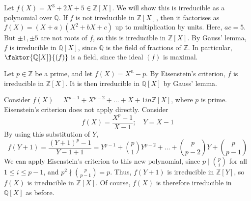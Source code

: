 \begin{example}
    Let \( f(X) = X^3 + 2X + 5 \in \mathbb Z[X] \).
    We will show this is irreducible as a polynomial over \( \mathbb Q \).
    If \( f \) is not irreducible in \( \mathbb Z[X] \), then it factorises as \( f(X) = (X+a)(X^2 + bX + c) \) up to multiplication by units.
    Here, \( ac = 5 \).
    But \( \pm 1, \pm 5 \) are not roots of \( f \), so this is irreducible in \( \mathbb Z[X] \).
    By Gauss' lemma, \( f \) is irreducible in \( \mathbb Q[X] \), since \( \mathbb Q \) is the field of fractions of \( \mathbb Z \).
    In particular, \( \faktor{\mathbb Q[X]}{(f)} \) is a field, since the ideal \( (f) \) is maximal.
\end{example}
\begin{example}
    Let \( p \in \mathbb Z \) be a prime, and let \( f(X) = X^n - p \).
    By Eisenstein's criterion, \( f \) is irreducible in \( \mathbb Z[X] \).
    It is then irreducible in \( \mathbb Q[X] \) by Gauss' lemma.
\end{example}
\begin{example}
    Consider \( f(X) = X^{p-1} + X^{p-2} + \dots + X + 1 in \mathbb Z[X] \), where \( p \) is prime.
    Eisenstein's criterion does not apply directly.
    Consider
    \[ f(X) = \frac{X^p - 1}{X - 1};\quad Y = X - 1 \]
    By using this substitution of \( Y \),
    \[ f(Y+1) = \frac{(Y+1)^p - 1}{Y-1 + 1} = Y^{p-1} + \binom{p}{1} Y^{p-2} + \dots + \binom{p}{p-2} Y + \binom{p}{p-1} \]
    We can apply Eisenstein's criterion to this new polynomial, since \( p \mid \binom{p}{i} \) for all \( 1 \leq i \leq p - 1 \), and \( p^2 \nmid \binom{p}{p-1} = p \).
    Thus, \( f(Y+1) \) is irreducible in \( \mathbb Z[Y] \), so \( f(X) \) is irreducible in \( \mathbb Z[X] \).
    Of course, \( f(X) \) is therefore irreducible in \( \mathbb Q[X] \) as before.
\end{example}

